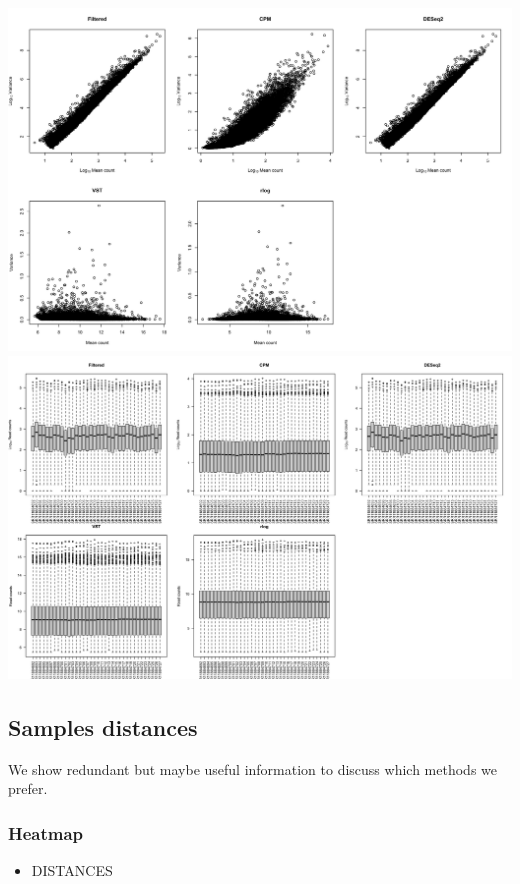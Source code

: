 \documentclass[
]{book}
\providecommand{\tightlist}{%
  \setlength{\itemsep}{0pt}\setlength{\parskip}{0pt}}
\begin{document}
\includegraphics{images/transformationCountsFiltered.png}
\includegraphics{images/transformationCountsFiltered_boxplot.png}

\hypertarget{samples-distances}{%
\subsection{Samples distances}\label{samples-distances}}

We show redundant but maybe useful information to discuss which methods we prefer.

\hypertarget{heatmap}{%
\subsubsection{Heatmap}\label{heatmap}}

\begin{itemize}
\tightlist
\item
  DISTANCES
\end{itemize}
\end{document}
